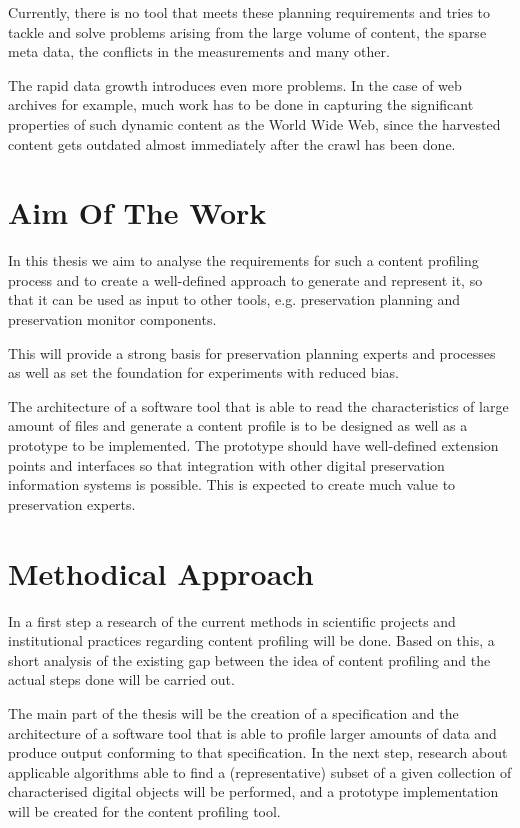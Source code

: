 Currently, there is no tool that meets these planning requirements and tries to tackle and solve problems arising from the large volume of content, the sparse meta data, the conflicts in the measurements and many other.

The rapid data growth introduces even more problems. In the case of web archives for example, much work has to be done in capturing the significant properties of such dynamic content as the World Wide Web, since the harvested content gets outdated almost immediately after the crawl has been done.

\section{Aim Of The Work}
\label{sec:aim_of_the_work}
In this thesis we aim to analyse the requirements for such a content profiling process and to create a well-defined approach to generate and represent it, so that it can be used as input to other tools, e.g. preservation planning and preservation monitor components.

This will provide a strong basis for preservation planning experts and processes as well as set the foundation for experiments with reduced bias.

The architecture of a software tool that is able to read the characteristics of large amount of files and generate a content
profile is to be designed as well as a prototype to be implemented. The prototype should have well-defined extension points and interfaces so that integration with other digital preservation information systems is possible. This is expected to create much value to preservation experts.

\section{Methodical Approach}
\label{sec:methodical_approach}
In a first step a research of the current methods in scientific projects and institutional practices regarding content profiling will be done. Based on this, a short analysis of the existing gap between the idea of content profiling and the actual steps done will be carried out. 

The main part of the thesis will be the creation of a specification and the architecture of a software tool that is able to profile larger amounts of data and produce output conforming to that specification. In the next step, research about applicable algorithms able to find a (representative) subset of a given collection of characterised digital objects will be performed, and a prototype implementation will be created for the content profiling tool. 

